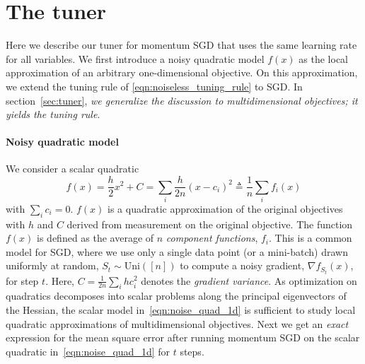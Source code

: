 \vspace{-0.2em}
\section{The \tuner tuner}
\label{sec:sync_tuner}
\vspace{-0.2em}

Here we describe our tuner for momentum SGD that uses the same learning rate for all variables.
We first introduce a noisy quadratic model $f(x)$ as the local approximation of an arbitrary one-dimensional objective. On this approximation, we extend the tuning rule of \eqref{eqn:noiseless_tuning_rule} to SGD. In section~\ref{sec:tuner}, \emph{we generalize the discussion to multidimensional objectives; it yields the \tuner tuning rule}.


\paragraph{Noisy quadratic model}
\label{sec:noisy_quadratics}

\newcommand{\oac}{origin-adjusted curvature }
\newcommand{\bx}{\bar{x}}


We consider a scalar quadratic 
\begin{equation}
	f(x) = \frac{h}{2} x^2 + C 
	= \sum_i \frac{h}{2n}(x-c_i)^2
	\triangleq \frac{1}{n} \sum_i f_i(x)
	\label{eqn:noise_quad_1d}
\end{equation}
with $\sum_i c_i = 0$. $f(x)$ is a quadratic approximation of the original objectives with $h$ and $C$ derived from measurement on the original objective. The function $f(x)$ is defined as the average of $n$ {\em component functions}, $f_i$.
This is a common model for SGD, where we use only a single data point (or a mini-batch) drawn uniformly at random, $S_t \sim \mathrm{Uni}([n])$ to compute a noisy gradient, $\nabla f_{S_t}(x)$, for step $t$.
Here, $C=\frac{1}{2n}\sum_i h c_i^2$ denotes the {\em gradient variance}.
As optimization on quadratics decomposes into scalar problems along the principal eigenvectors of the Hessian, the scalar model in~\eqref{eqn:noise_quad_1d} is sufficient to study local quadratic approximations of multidimensional objectives.
Next we get an {\em exact} expression for the mean square error after running momentum SGD on the scalar quadratic in~\eqref{eqn:noise_quad_1d} for $t$ steps.



